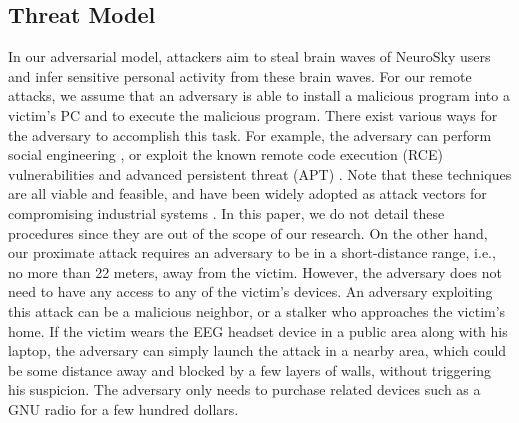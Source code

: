 \subsection{Threat Model}
In our adversarial model, attackers aim to steal brain waves of NeuroSky users and infer sensitive personal activity from these brain waves. For our remote attacks, we assume that an adversary is able to install a malicious program into a victim's PC and to execute the malicious program. There exist various ways for the adversary to accomplish this task. For example, the adversary can perform social engineering \cite{socialengineering}, or exploit the known remote code execution (RCE) vulnerabilities \cite{rce} and advanced persistent threat (APT) \cite{apt}. Note that these techniques are all viable and feasible, and have been widely adopted as attack vectors for compromising industrial systems \cite{socialengieerstat}\cite{aptstat}\cite{vulstat}. In this paper, we do not detail these procedures since they are out of the scope of our research. On the other hand, our proximate attack requires an adversary to be in a short-distance range, i.e., no more than 22 meters, away from the victim. However, the adversary does not need to have any access to any of the victim's devices. An adversary exploiting this attack can be a malicious neighbor, or a stalker who approaches the victim's home. If the victim wears the EEG headset device in a public area along with his laptop, the adversary can simply launch the attack in a nearby area, which could be some distance away and blocked by a few layers of walls, without triggering his suspicion. The adversary only needs to purchase related devices such as a GNU radio for a few hundred dollars.


